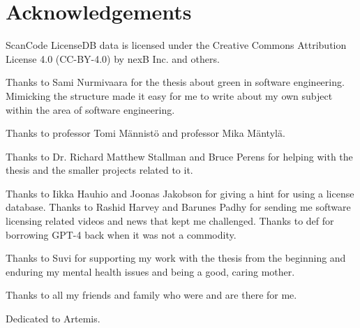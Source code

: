 \section*{Acknowledgements}
ScanCode LicenseDB data is licensed under the Creative Commons Attribution License 4.0 (CC-BY-4.0) by nexB Inc. and others.

Thanks to Sami Nurmivaara for the thesis about green in software engineering. Mimicking the structure made it easy for me to write about my own subject within the area of software engineering. 

Thanks to professor Tomi Männistö and professor Mika Mäntylä.

Thanks to Dr. Richard Matthew Stallman and Bruce Perens for helping with the thesis and the smaller projects related to it.

Thanks to Iikka Hauhio and Joonas Jakobson for giving a hint for using a license database. Thanks to Rashid Harvey and Barunes Padhy for sending me software licensing related videos and news that kept me challenged. Thanks to def for borrowing GPT-4 back when it was not a commodity. 


Thanks to Suvi for supporting my work with the thesis from the beginning and enduring my mental health issues and being a good, caring mother.

Thanks to all my friends and family who were and are there for me.

Dedicated to Artemis.